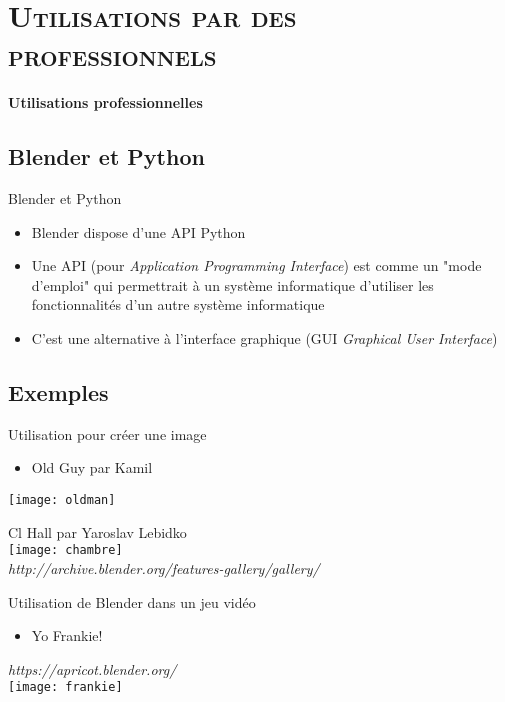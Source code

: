 \documentclass[xcolor=x11names,compress]{beamer}
\renewcommand{\(}{\begin{columns}}
\renewcommand{\)}{\end{columns}}
\newcommand{\<}[1]{\begin{column}{#1}}
\renewcommand{\>}{\end{column}}
\begin{document}
\section{\scshape Utilisations par des professionnels}
\begin{frame}[c]{}
    \centering
    \huge
    \textbf{Utilisations professionnelles}
\end{frame}

\subsection{Blender et Python}
\begin{frame}{Blender et Python}
    \begin{itemize}
        \item Blender dispose d'une API Python\\
        \item Une API (pour \textit{Application Programming Interface}) est comme un "mode d'emploi" qui permettrait à un système informatique d'utiliser les fonctionnalités d'un autre système informatique
        \item C'est une alternative à l'interface graphique (GUI \textit{Graphical User Interface})
    \end{itemize}
\end{frame}


\subsection{Exemples}
\begin{frame}{Utilisation pour créer une image}
    \begin{itemize}
        \item Old Guy par Kamil\\
    \end{itemize}
    \texttt{[image: oldman]}
    \item Cl Hall par Yaroslav Lebidko\\
    \texttt{[image: chambre]}\\
    \textit{http://archive.blender.org/features-gallery/gallery/}\\
\end{frame}

\begin{frame}{Utilisation de Blender dans un jeu vidéo}
    \begin{itemize}
        \item Yo Frankie!\\
    \end{itemize}
    \textit{https://apricot.blender.org/}\\
    \texttt{[image: frankie]}
\end{frame}
\end{document}
